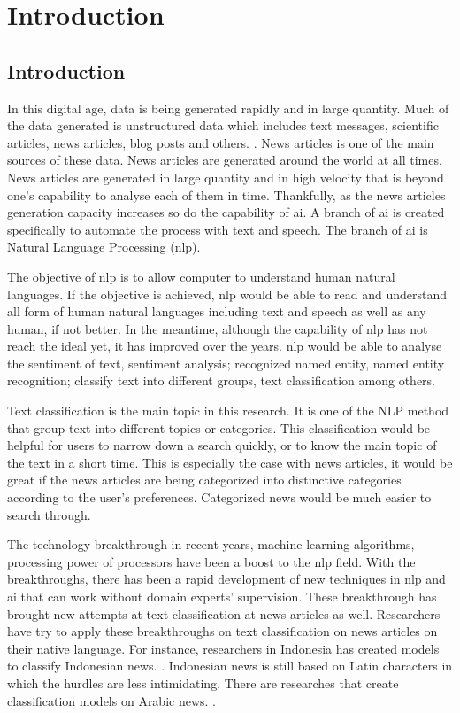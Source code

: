 \chapter{Introduction}
\section{Introduction}
In this digital age, data is being generated rapidly and in large quantity. Much of the data generated is unstructured data which includes text messages, scientific articles, news articles, blog posts and others. \cite{bigData}. News articles is one of the main sources of these data. News articles are generated around the world at all times. News articles are generated in large quantity and in high velocity that is beyond one's capability to analyse each of them in time. Thankfully, as the news articles generation capacity increases so do the capability of \ac{ai}. A branch of \ac{ai} is created specifically to automate the process with text and speech. The branch of \ac{ai} is Natural Language Processing (\ac{nlp}).

The objective of \ac{nlp} is to allow computer to understand human natural languages. If the objective is achieved, \ac{nlp} would be able to read and understand all form of human natural languages including text  and speech as well as any human, if not better. In the meantime, although the capability of \ac{nlp} has not reach the ideal yet, it has improved over the years. \Ac{nlp} would be able to analyse the sentiment of text, sentiment analysis; recognized named entity, named entity recognition; classify text into different groups, text classification among others.

Text classification is the main topic in this research. It is one of the NLP method that group text into different topics or categories. This classification would be helpful for users to narrow down a search quickly, or to know the main topic of the text in a short time. This is especially the case with news articles, it would be great if the news articles are being categorized into distinctive categories according to the user's preferences. Categorized news would be much easier to search through.

The technology breakthrough in recent years, machine learning algorithms, processing power of processors have been a boost to the \ac{nlp} field. With the breakthroughs, there has been a rapid development of new techniques in \ac{nlp} and \ac{ai} that can work without domain experts' supervision. These breakthrough has brought new attempts at text classification at news articles as well. Researchers have try to apply these breakthroughs on text classification on news articles on their native language. For instance, researchers in Indonesia has created models to classify Indonesian news. \cite{WONGSO2017137}. Indonesian news is still based on Latin characters in which the hurdles are less intimidating. There are researches that create classification models on Arabic news. \cite{arabicNews}.


